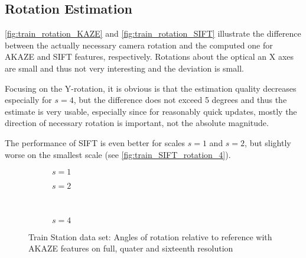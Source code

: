 \subsection{Rotation Estimation}

\autoref{fig:train_rotation_KAZE} and \autoref{fig:train_rotation_SIFT} illustrate the
difference between the actually necessary camera rotation and the computed one
for AKAZE and SIFT features, respectively. Rotations about the optical an X axes
are small and thus not very interesting and the deviation is small. 

Focusing on the Y-rotation, it is obvious is that the estimation
quality decreases especially for $s=4$, but the difference does not exceed 5
degrees and thus the estimate is very usable, especially since for reasonably
quick updates, mostly the direction of necessary rotation is important, not the
absolute magnitude.

The performance of SIFT is even better for scales $s=1$ and $s=2$, but slightly
worse on the smallest scale (see \autoref{fig:train_SIFT_rotation_4}).

\begin{figure}
   \begin{subfigure}{.5\linewidth}
      \centering      
      
      \caption{$s=1$}
      \label{fig:train_KAZE_rotation_1}
   \end{subfigure}
   \quad
   \begin{subfigure}{.5\linewidth}
      \centering      
      
      \caption{$s=2$}
      \label{fig:train_KAZE_rotation_2}
   \end{subfigure}\\[3ex]
   \begin{subfigure}{\linewidth}
      \centering      
      
      \caption{$s=4$}
      \label{fig:train_KAZE_rotation_4}
   \end{subfigure}
   \caption[Train data: Rotation AKAZE]{Train Station data set: Angles of rotation relative to reference with
   AKAZE features on full, quater and sixteenth resolution}
   \label{fig:train_rotation_KAZE}
\end{figure}

